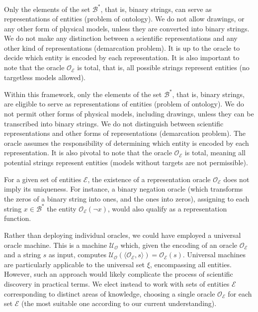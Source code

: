 Only the elements of the set $\mathcal{B}^\ast$, that is, binary strings, can serve as representations of entities (problem of ontology). We do not allow drawings, or any other form of physical models, unless they are converted into binary strings. We do not make any distinction between a scientific representations and any other kind of representations (demarcation problem). It is up to the oracle to decide which entity is encoded by each representation. It is also important to note that the oracle $\mathcal{O}_\mathcal{E}$ is total, that is, all possible strings represent entities (no targetless models allowed).

Within this framework, only the elements of the set $\mathcal{B}^\ast$, that is, binary strings, are eligible to serve as representations of entities (problem of ontology). We do not permit other forms of physical models, including drawings, unless they can be transcribed into binary strings. We do not distinguish between scientific representations and other forms of representations (demarcation problem). The oracle assumes the responsibility of determining which entity is encoded by each representation. It is also pivotal to note that the oracle $\mathcal{O}_\mathcal{E}$ is total, meaning all potential strings represent entities (models without targets are not permissible).

\begin{example}
\label{ex:not_unique_oracle}
For a given set of entities $\mathcal{E}$, the existence of a representation oracle $\mathcal{O}_\mathcal{E}$ does not imply its uniqueness. For instance, a binary negation oracle (which transforms the zeros of a binary string into ones, and the ones into zeros), assigning to each string $x \in \mathcal{B}^\ast$ the entity $\mathcal{O}_\mathcal{E} \left( \neg x \right)$, would also qualify as a representation function.
\end{example}

Rather than deploying individual oracles, we could have employed a universal oracle machine. This is a machine $\mathcal{U}_\mathcal{O}$ which, given the encoding of an oracle $\mathcal{O}_\mathcal{E}$ and a string $s$ as input, computes $\mathcal{U}_\mathcal{O} \left( \langle \mathcal{O}_\mathcal{E}, s \rangle \right) = \mathcal{O}_\mathcal{E} \left( s \right)$. Universal machines are particularly applicable to the universal set $\xi$, encompassing all entities. However, such an approach would likely complicate the process of scientific discovery in practical terms. We elect instead to work with sets of entities $\mathcal{E}$ corresponding to distinct areas of knowledge, choosing a single oracle $\mathcal{O}_\mathcal{E}$ for each set $\mathcal{E}$ (the most suitable one according to our current understanding).

